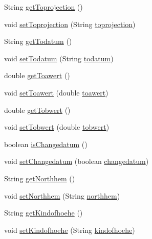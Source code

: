 \begin{DoxyCompactItemize}
\item 
String \hyperlink{classparams_1_1_control_parms_a2d485a515e99332d5c1712f298ccabc1}{get\+Toprojection} ()
\item 
void \hyperlink{classparams_1_1_control_parms_aa1c2641c116c78d09adf7fcd36f1e646}{set\+Toprojection} (String \hyperlink{classparams_1_1_control_parms_ad4c562a7ccfd2c0909af99b2555f7c12}{toprojection})
\item 
String \hyperlink{classparams_1_1_control_parms_a44eaedb52a3f19108a3458ce918e73ee}{get\+Todatum} ()
\item 
void \hyperlink{classparams_1_1_control_parms_a13d42878222bafbe8d3c48fdd3955220}{set\+Todatum} (String \hyperlink{classparams_1_1_control_parms_a930769d55920443b555a18d86f79a410}{todatum})
\item 
double \hyperlink{classparams_1_1_control_parms_a39ce573f000eb18b6cf676e1f43fb0b5}{get\+Toawert} ()
\item 
void \hyperlink{classparams_1_1_control_parms_a1cbbd11c3436b09ac7063fef1c2149bb}{set\+Toawert} (double \hyperlink{classparams_1_1_control_parms_a15c11042320f3bdcc8da8d2cc885b975}{toawert})
\item 
double \hyperlink{classparams_1_1_control_parms_ad2092609e231fabe769def50523a206e}{get\+Tobwert} ()
\item 
void \hyperlink{classparams_1_1_control_parms_af66e9cb53a14ea90d0f61e3d8649be38}{set\+Tobwert} (double \hyperlink{classparams_1_1_control_parms_a1d7775bde246e74d651d87ca38e247ba}{tobwert})
\item 
boolean \hyperlink{classparams_1_1_control_parms_ab1496ac78857153a556b98b357595e1b}{is\+Changedatum} ()
\item 
void \hyperlink{classparams_1_1_control_parms_a5e5239551fb75c863e259c27ddd375b1}{set\+Changedatum} (boolean \hyperlink{classparams_1_1_control_parms_a863cdfdf5647ef0c8f9864cae1dfc753}{changedatum})
\item 
String \hyperlink{classparams_1_1_control_parms_a29550d5e3b87f28380b8d0db21c49840}{get\+Northhem} ()
\item 
void \hyperlink{classparams_1_1_control_parms_a58f9db5f3fc7cfae594313291bc3b4e3}{set\+Northhem} (String \hyperlink{classparams_1_1_control_parms_a1b7d4bdc68c2531026174a04ad715cbf}{northhem})
\item 
String \hyperlink{classparams_1_1_control_parms_af15591462a29b3376f5e6008683d8855}{get\+Kindofhoehe} ()
\item 
void \hyperlink{classparams_1_1_control_parms_af6c0cee9ad8df502734e0679cdc6b283}{set\+Kindofhoehe} (String \hyperlink{classparams_1_1_control_parms_a639927766fce23759b47659a9abf0e6f}{kindofhoehe})

\end{DoxyCompactItemize}
